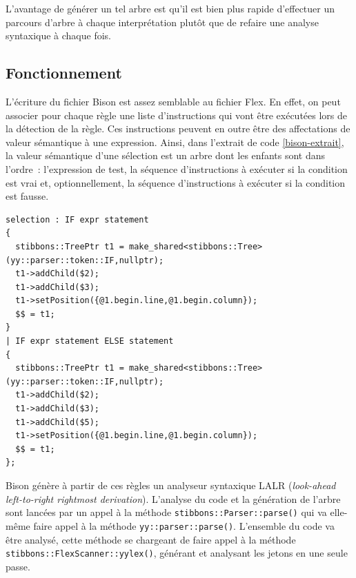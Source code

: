 L'avantage de générer un tel arbre est qu'il est bien plus rapide d'effectuer un parcours d'arbre à chaque interprétation plutôt que de refaire une analyse syntaxique à chaque fois.

\subsection{Fonctionnement}
L'écriture du fichier Bison est assez semblable au fichier Flex. En effet, on peut associer pour chaque règle une liste d'instructions qui vont être exécutées lors de la détection de la règle. Ces instructions peuvent en outre être des affectations de valeur sémantique à une expression. Ainsi, dans l'extrait de code \ref{bison-extrait}, la valeur sémantique d'une sélection est un arbre dont les enfants sont dans l'ordre~: l'expression de test, la séquence d'instructions à exécuter si la condition est vrai et, optionnellement, la séquence d'instructions à exécuter si la condition est fausse.

\begin{lstlisting}[label=bison-extrait,caption=Cas du IF en Bison]
selection : IF expr statement 
{
  stibbons::TreePtr t1 = make_shared<stibbons::Tree>(yy::parser::token::IF,nullptr);
  t1->addChild($2);
  t1->addChild($3);
  t1->setPosition({@1.begin.line,@1.begin.column});
  $$ = t1;
}
| IF expr statement ELSE statement
{
  stibbons::TreePtr t1 = make_shared<stibbons::Tree>(yy::parser::token::IF,nullptr);
  t1->addChild($2);
  t1->addChild($3);
  t1->addChild($5);
  t1->setPosition({@1.begin.line,@1.begin.column});
  $$ = t1;
};
\end{lstlisting}

Bison génère à partir de ces règles un analyseur syntaxique LALR (\emph{look-ahead left-to-right rightmost derivation}). L'analyse du code et la génération de l'arbre sont lancées par un appel à la méthode \verb|stibbons::Parser::parse()| qui va elle-même faire appel à la méthode \verb|yy::parser::parse()|. L'ensemble du code va être analysé, cette méthode se chargeant de faire appel à la méthode \verb|stibbons::FlexScanner::yylex()|, générant et analysant les jetons en une seule passe.
